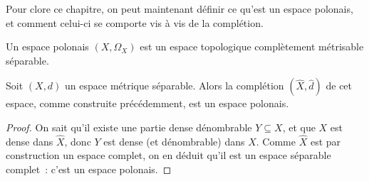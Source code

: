 Pour clore ce chapitre, on peut maintenant définir ce qu'est un espace polonais,
et comment celui-ci se comporte vis à vis de la complétion.

\begin{definition}
  Un espace polonais $(X,\Omega_X)$ est un espace topologique complètement
  métrisable séparable.
\end{definition}

\begin{proposition}
  Soit $(X,d)$ un espace métrique séparable. Alors la complétion
  $(\hat X,\hat d)$ de cet espace, comme construite précédemment, est un espace
  polonais.
\end{proposition}

\begin{proof}
  On sait qu'il existe une partie dense dénombrable $Y\subseteq X$, et que
  $X$ est dense dans $\hat X$, donc $Y$ est dense (et dénombrable) dans
  $\hat X$. Comme $\hat X$ est par construction un espace complet, on en déduit
  qu'il est un espace séparable complet~: c'est un espace polonais.
\end{proof}

